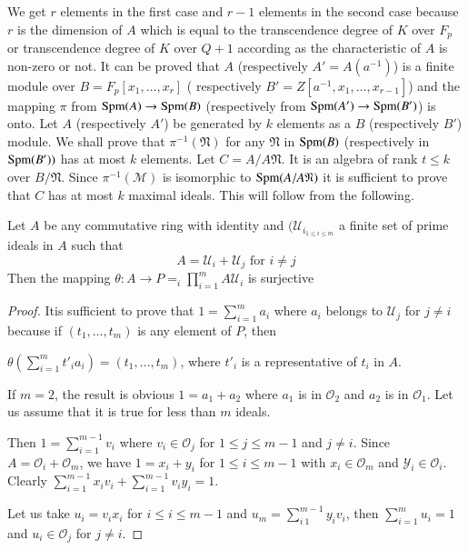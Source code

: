 We get $r$ elements in the first case and  $r-1$ elements in the
second case because $r$ is the dimension  of $A$ which is equal to the
transcendence degree of $K$ over $F_p$ or transcendence degree of $K$
over $Q+1$ according as the characteristic of $A$ is non-zero or
not. It can be proved that $A$ (respectively $A' =A(a^{-1})$) is a
finite module over $B=F_p [x_1, \ldots,  x_r ]$ ( respectively $B' =Z
[a^{-1},x_1, \ldots,  x_{r-1} ]$) and the mapping  $\pi$ from
$\operatorname{Spm}(A) \rightarrow \operatorname{Spm} (B)$ (respectively from $\operatorname{Spm} (A')
\rightarrow \operatorname{Spm} (B')$) is onto. Let $A$ (respectively $A'$) be
generated by $k$ elements as a $B$ (respectively $B'$) module.  We
shall prove that 
$\pi^{-1}(\mathfrak{N})$ for any $\mathfrak{N}$ in $\operatorname{Spm}(B)$ 
(respectively in $\operatorname{Spm} (B'))$ has at most $k$ elements.  Let $C= A/A
\mathfrak{N}$. It is an algebra of rank $t \le k$ over  $B/
\mathfrak{N}$. Since $\pi^{-1}(\mathcal{M})$ is isomorphic to $\operatorname{Spm}
(A/A \mathfrak{N})$ it is sufficient to prove that $C$ has at most $k$
maximal ideals. This will follow from the following. 

\begin{lemma*}[II]
  Let $A$ be any commutative ring with identity and  $(\mathcal{U}_{i_{1
      \le i \le m}}$ a finite set of prime ideals in $A$ such that 
  $$
  A= \mathcal{U}_i + \mathcal{U}_j  \text{ for } i \neq j
  $$ 
  Then the mapping  $\theta:A \to P = _i \prod\limits^m_{i=1} A
  \mathcal{U}_i$ is surjective 
\end{lemma*}

\begin{proof}
  It\pageoriginale is sufficient to prove that $1=\sum \limits_{i=1}^m a_i$ where
  $a_i$ belongs to $\mathcal{U}_j$ for $j \neq i$ because if $(t_1,\ldots,t_m )$
  is any element of $P$, then 

  $\theta\left(\sum \limits_{i=1}^{m}t'_i a_i\right)=(t_1,\ldots,t_m)$, where
  $t'_i$ is a representative of $t_i$ in $A$. 
  
  If $m=2$, the result is obvious \iec  $1=a_1+a_2$ where $a_1$ is in
  $\mathscr{O}_2$ and $a_2$ is in $\mathscr{O}_1$. Let us assume that
  it is true for less than $m$ ideals. 

  Then $1=\sum \limits_{i=1}^{m-1}v_i$ where $v_i \in \mathscr{O}_j$
  for $1 \leq j \leq m-1$ and $j \neq i$. Since
  $A=\mathscr{O}_i+\mathscr{O}_m$, we have $1=x_i + y_i$ for $1\leq i
  \leq m-1$ with $x_i \in \mathscr{O}_m$ and $\mathscr{Y}_i \in
  \mathscr{O}_i$. Clearly $\sum \limits _{i=1}^{m-1}x_i v_i+ \sum
  \limits _{i=1}^{m-1}v_i y_i=1$. 

  Let us take $u_i=v_i x_i$ for $i \leq i \leq m-1$ and $u_m=\sum
  \limits^{m-1}_{i~1} y_i v_i$, then $\sum \limits
  ^{m}_{i=1}u_i=1$ and $u_i \in \mathscr{O}_j$ for $j \neq i$. 
\end{proof}

